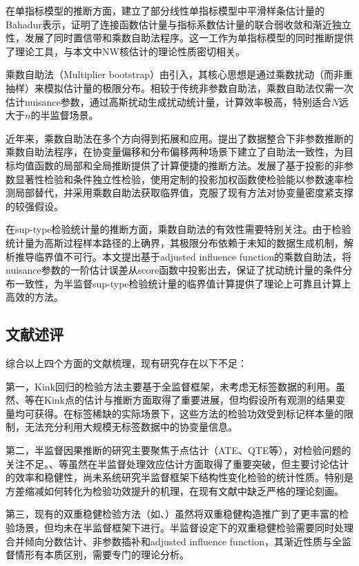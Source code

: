 \documentclass[12pt,a4paper]{ctexart}
\renewcommand*{\cite}{\supercite}
\begin{document}
在单指标模型的推断方面，\cite{tang2024}建立了部分线性单指标模型中平滑样条估计量的Bahadur表示，证明了连接函数估计量与指标系数估计量的联合弱收敛和渐近独立性，发展了同时置信带和乘数自助法程序。这一工作为单指标模型的同时推断提供了理论工具，与本文中NW核估计的理论性质密切相关。

乘数自助法（Multiplier bootstrap）由\cite{mammen1993}引入，其核心思想是通过乘数扰动（而非重抽样）来模拟估计量的极限分布。相较于传统非参数自助法，乘数自助法仅需一次估计nuisance参数，通过高斯扰动生成扰动统计量，计算效率极高，特别适合$N$远大于$n$的半监督场景。

近年来，乘数自助法在多个方向得到拓展和应用。\cite{shang2025}提出了数据整合下非参数推断的乘数自助法程序，在协变量偏移和分布偏移两种场景下建立了自助法一致性，为目标均值函数的局部和全局推断提供了计算便捷的推断方法。\cite{song2026}发展了基于投影的非参数显著性检验和条件独立性检验，使用定制的投影加权函数使检验能以参数速率检测局部替代，并采用乘数自助法获取临界值，克服了现有方法对协变量密度紧支撑的较强假设。

在sup-type检验统计量的推断方面，乘数自助法的有效性需要特别关注。由于检验统计量为高斯过程样本路径的上确界，其极限分布依赖于未知的数据生成机制，解析推导临界值不可行。本文提出基于adjusted influence function的乘数自助法，将nuisance参数的一阶估计误差从score函数中投影出去，保证了扰动统计量的条件分布一致性，为半监督sup-type检验统计量的临界值计算提供了理论上可靠且计算上高效的方法。

\subsection{文献述评}

综合以上四个方面的文献梳理，现有研究存在以下不足：

第一，Kink回归的检验方法主要基于全监督框架，未考虑无标签数据的利用。虽然\cite{calonico2014}、\cite{wang2025}等在Kink点的估计与推断方面取得了重要进展，但均假设所有观测的结果变量均可获得。在标签稀缺的实际场景下，这些方法的检验功效受到标记样本量的限制，无法充分利用大规模无标签数据中的协变量信息。

第二，半监督因果推断的研究主要聚焦于点估计（ATE、QTE等），对检验问题的关注不足。\cite{chakrabortty2024}、\cite{zhang2023}等虽然在半监督处理效应估计方面取得了重要突破，但主要讨论估计的效率和稳健性，尚未系统研究半监督框架下结构性变化检验的统计性质。特别是方差缩减如何转化为检验功效提升的机理，在现有文献中缺乏严格的理论刻画。

第三，现有的双重稳健检验方法（如\cite{jain2026}、\cite{boileau2025}）虽然将双重稳健构造推广到了更丰富的检验场景，但均未在半监督框架下进行。半监督设定下的双重稳健检验需要同时处理合并倾向分数估计、非参数插补和adjusted influence function，其渐近性质与全监督情形有本质区别，需要专门的理论分析。
\end{document}
